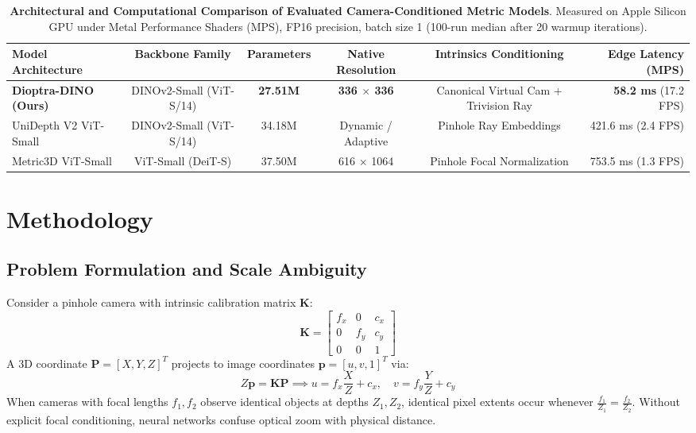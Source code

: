 \documentclass[10pt,twocolumn,letterpaper]{article}
\begin{document}
\begin{table}[t]
\centering
\caption{\textbf{Architectural and Computational Comparison of Evaluated Camera-Conditioned Metric Models}. Measured on Apple Silicon GPU under Metal Performance Shaders (MPS), FP16 precision, batch size 1 (100-run median after 20 warmup iterations).}
\label{tab:arch_comparison}
\small
\begin{tabular}{lccccr}
\toprule
\textbf{Model Architecture} & \textbf{Backbone Family} & \textbf{Parameters} & \textbf{Native Resolution} & \textbf{Intrinsics Conditioning} & \textbf{Edge Latency (MPS)} \\
\midrule
\textbf{Dioptra-DINO (Ours)} & DINOv2-Small (ViT-S/14) & \textbf{27.51M} & \textbf{336 $\times$ 336} & Canonical Virtual Cam + Trivision Ray & \textbf{58.2 ms} (17.2 FPS) \\
UniDepth V2 ViT-Small \cite{piccinelli2024unidepth} & DINOv2-Small (ViT-S/14) & 34.18M & Dynamic / Adaptive & Pinhole Ray Embeddings & 421.6 ms (2.4 FPS) \\
Metric3D ViT-Small \cite{yin2023metric3d} & ViT-Small (DeiT-S) & 37.50M & 616 $\times$ 1064 & Pinhole Focal Normalization & 753.5 ms (1.3 FPS) \\
\bottomrule
\end{tabular}
\end{table}

\section{Methodology}

\subsection{Problem Formulation and Scale Ambiguity}
Consider a pinhole camera with intrinsic calibration matrix $\mathbf{K}$:
\begin{equation}
\mathbf{K} = \begin{bmatrix} f_x & 0 & c_x \\ 0 & f_y & c_y \\ 0 & 0 & 1 \end{bmatrix}
\end{equation}
A 3D coordinate $\mathbf{P} = [X, Y, Z]^T$ projects to image coordinates $\mathbf{p} = [u, v, 1]^T$ via:
\begin{equation}
Z \mathbf{p} = \mathbf{K} \mathbf{P} \implies u = f_x \frac{X}{Z} + c_x, \quad v = f_y \frac{Y}{Z} + c_y
\end{equation}
When cameras with focal lengths $f_1, f_2$ observe identical objects at depths $Z_1, Z_2$, identical pixel extents occur whenever $\frac{f_1}{Z_1} = \frac{f_2}{Z_2}$. Without explicit focal conditioning, neural networks confuse optical zoom with physical distance.
\end{document}
